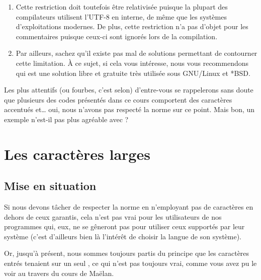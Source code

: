 \begin{infobox}
  \begin{enumerate}  
    \item
    Cette restriction doit toutefois être relativisée puisque la plupart 
    des compilateurs utilisent l'UTF-8 en interne, de même que les systèmes 
    d'exploitations modernes. De plus, cette restriction n'a pas d'objet pour 
    les commentaires puisque ceux-ci sont ignorés lors de la compilation.
    \item
    Par ailleurs, sachez
    qu'il existe pas mal de solutions permettant de contourner cette
    limitation. À ce sujet, si cela vous intéresse, nous vous recommendons
     qui est une solution libre et gratuite très utilisée sous
    GNU/Linux et *BSD. 
  \end{enumerate}
\end{infobox}


\begin{attentionbox}
 Les plus attentifs (ou fourbes, c'est
selon) d'entre-vous se rappelerons sans doute que plusieurs des
codes présentés dans ce cours comportent des caractères accentués
et\ldots{} oui, nous n'avons pas respecté la norme sur ce point. Mais
bon, un exemple n'est-il pas plus agréable avec ?
\end{attentionbox}

\section{Les caractères larges}
\label{les-caractères-larges}

\subsection{Mise en situation}
\label{mise-en-situation-2}

Si nous devons tâcher de respecter la norme en n'employant pas de
caractères en dehors de ceux garantis, cela n'est pas vrai pour les
utilisateurs de nos programmes qui, eux, ne se gêneront pas pour
utiliser ceux supportés par leur système (c'est d'ailleurs bien là
l'intérêt de choisir la langue de son système).

Or, jusqu'à présent, nous sommes toujours partis du principe que les
caractères entrés tenaient sur un seul , ce qui n'est pas
toujours vrai, comme vous avez pu le voir au travers du cours de Maëlan.

